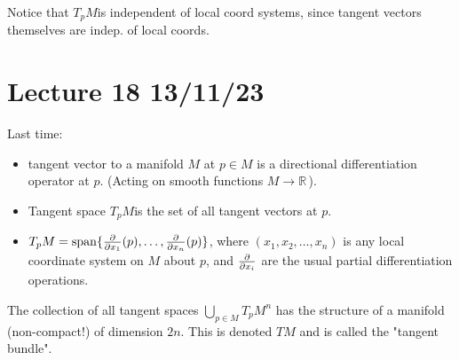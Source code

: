\documentclass[12pt,a4paper]{article}
\newcommand{\rR}{\ensuremath{\mathbb{R}\,}}
\newcommand{\tpm}{\ensuremath{T_p M}}
\newcommand{\tm}{\ensuremath{T M}}
\begin{document}
Notice that \tpm is independent of local coord systems, since tangent vectors themselves are indep. of local coords.

\section{Lecture 18 13/11/23}

Last time:

\begin{itemize}
\item tangent vector to a manifold $M$ at $p\in M$ is a directional differentiation operator at $p$. (Acting on smooth functions $M\to \rR$).
\item Tangent space \tpm is the set of all tangent vectors at $p$.
\item $\tpm = \operatorname{span}\{\pdv{x_1}(p),\ldots, \pdv{x_n}(p) \}$, where $(x_1,x_2,\ldots, x_n)$ is any local coordinate system on $M$ about $p$, and $\pdv{x_i}$ are the usual partial differentiation operations.
\end{itemize}

The collection of all tangent spaces $\bigcup\limits_{p\in M} \tpm^n$ has the structure of a manifold (non-compact!) of dimension $2n$. This is denoted $\tm$ and is called the "tangent bundle".
\end{document}

